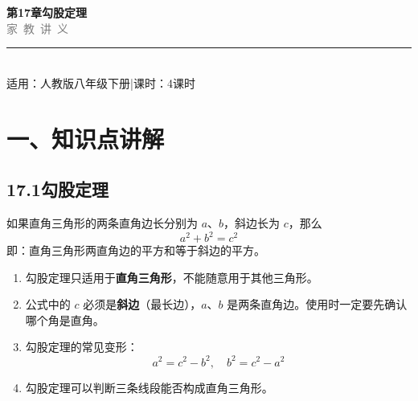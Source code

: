 \documentclass[12pt, a4paper]{ctexart}
\begin{document}
\begin{center}
{\Huge\bfseries\textcolor{mainblue}{第17章\quad 勾股定理}}\\[12pt]
{\Large\textcolor{gray}{家\ 教\ 讲\ 义}}\\[8pt]
\rule{0.6\textwidth}{1pt}\\[8pt]
{\normalsize 适用：人教版\quad 八年级下册\quad |\quad 课时：4课时}
\end{center}
\vspace{10pt}

\section*{\textcolor{mainblue}{一、知识点讲解}}

\subsection*{17.1\quad 勾股定理}

\begin{knowledgebox}[勾股定理]
如果直角三角形的两条直角边长分别为 $a$、$b$，斜边长为 $c$，那么
\[
a^2 + b^2 = c^2
\]
即：直角三角形两直角边的平方和等于斜边的平方。
\end{knowledgebox}

\begin{center}
\end{center}

\begin{warnbox}[易错提醒]
\begin{enumerate}[label=\arabic*.]
  \item 勾股定理只适用于\textbf{直角三角形}，不能随意用于其他三角形。
  \item 公式中的 $c$ 必须是\textbf{斜边}（最长边），$a$、$b$ 是两条直角边。使用时一定要先确认哪个角是直角。
  \item 勾股定理的常见变形：
  \[
  a^2 = c^2 - b^2, \quad b^2 = c^2 - a^2
  \]
  \item 勾股定理可以判断三条线段能否构成直角三角形。
\end{enumerate}
\end{warnbox}
\end{document}
